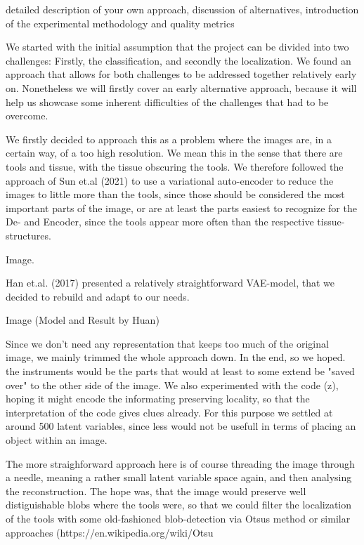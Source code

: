 detailed description of your own approach, discussion of alternatives, introduction of the experimental methodology and quality metrics


We started with the initial assumption that the project can be divided into two challenges: Firstly, the classification, and secondly the localization. We found an approach that allows for both challenges to be addressed together relatively early on. Nonetheless we will firstly cover an early alternative approach, because it will help us showcase some inherent difficulties of the challenges that had to be overcome.

We firstly decided to approach this as a problem where the images are, in a certain way, of a too high resolution. We mean this in the sense that there are tools and tissue, with the tissue obscuring the tools. We therefore followed the approach of Sun et.al (2021) to use a variational auto-encoder to reduce the images to little more than the tools, since those should be considered the most important parts of the image, or are at least the parts easiest to recognize for the De- and Encoder, since the tools appear more often than the respective tissue-structures.

Image.

Han et.al. (2017) presented a relatively straightforward VAE-model, that we decided to rebuild and adapt to our needs. 

Image (Model and Result by Huan)

Since we don't need any representation that keeps too much of the original image, we mainly trimmed the whole approach down.
In the end, so we hoped. the instruments would be the parts that would at least to some extend be "saved over" to the other side of the image. We also experimented with the code (z), hoping it might encode the informating preserving locality, so that the interpretation of the code gives clues already. For this purpose we settled at around 500 latent variables, since less would not be usefull in terms of placing an object within an image. 

The more straighforward approach here is of course threading the image through a needle, meaning a rather small latent variable space again, and then analysing the reconstruction. The hope was, that the image would preserve well distiguishable blobs where the tools were, so that we could filter the localization of the tools with some old-fashioned blob-detection via Otsus method or similar approaches (https://en.wikipedia.org/wiki/Otsu%

